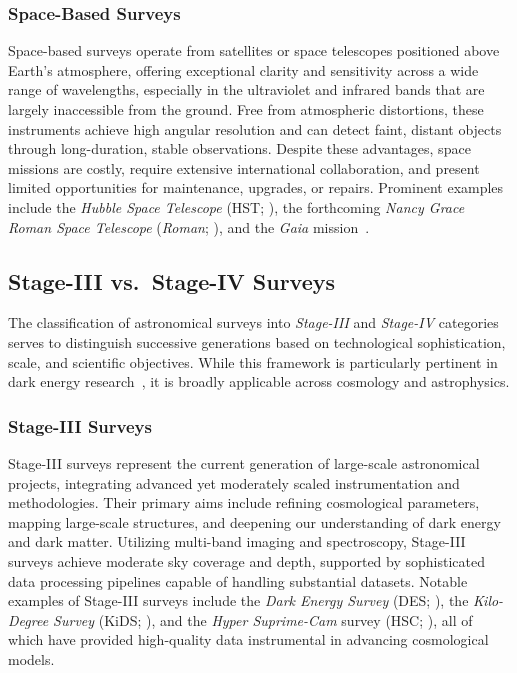 \subsubsection{Space-Based Surveys}
Space-based surveys operate from satellites or space telescopes positioned above Earth's atmosphere, offering exceptional clarity and sensitivity across a wide range of wavelengths, especially in the ultraviolet and infrared bands that are largely inaccessible from the ground. Free from atmospheric distortions, these instruments achieve high angular resolution and can detect faint, distant objects through long-duration, stable observations. Despite these advantages, space missions are costly, require extensive international collaboration, and present limited opportunities for maintenance, upgrades, or repairs. Prominent examples include the \emph{Hubble Space Telescope} (HST; \citealt{2001ApJ...553...47F}), the forthcoming \emph{Nancy Grace Roman Space Telescope} (\emph{Roman}; \citealt{2015arXiv150303757S}), and the \emph{Gaia} mission~\citep{2016A&A...595A...2G}.

\subsection{Stage-III vs.\ Stage-IV Surveys}
\label{sec:survey-stages}

The classification of astronomical surveys into \emph{Stage-III} and \emph{Stage-IV} categories serves to distinguish successive generations based on technological sophistication, scale, and scientific objectives. While this framework is particularly pertinent in dark energy research~\cite{2006astro.ph..9591A}, it is broadly applicable across cosmology and astrophysics.

\subsubsection{Stage-III Surveys}
Stage-III surveys represent the current generation of large-scale astronomical projects, integrating advanced yet moderately scaled instrumentation and methodologies. Their primary aims include refining cosmological parameters, mapping large-scale structures, and deepening our understanding of dark energy and dark matter. Utilizing multi-band imaging and spectroscopy, Stage-III surveys achieve moderate sky coverage and depth, supported by sophisticated data processing pipelines capable of handling substantial datasets. Notable examples of Stage-III surveys include the \emph{Dark Energy Survey} (DES; \citealt{2018ApJS..239...18A}), the \emph{Kilo-Degree Survey} (KiDS; \citealt{2013Msngr.154...44D}), and the \emph{Hyper Suprime-Cam} survey (HSC; \citealt{2018PASJ...70S...4A}), all of which have provided high-quality data instrumental in advancing cosmological models.

